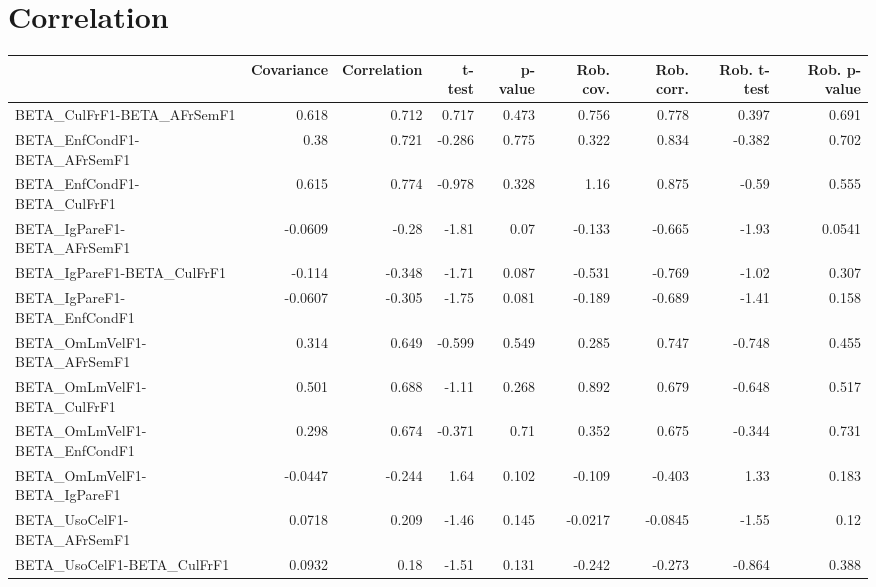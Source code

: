 \section{Correlation}
\begin{tabular}{lrrrrrrrr}
\toprule
{} &  Covariance &  Correlation &  t-test &  p-value &  Rob. cov. &  Rob. corr. &  Rob. t-test &  Rob. p-value \\
\midrule
BETA\_CulFrF1-BETA\_AFrSemF1            &       0.618 &        0.712 &   0.717 &    0.473 &      0.756 &       0.778 &        0.397 &         0.691 \\
BETA\_EnfCondF1-BETA\_AFrSemF1          &        0.38 &        0.721 &  -0.286 &    0.775 &      0.322 &       0.834 &       -0.382 &         0.702 \\
BETA\_EnfCondF1-BETA\_CulFrF1           &       0.615 &        0.774 &  -0.978 &    0.328 &       1.16 &       0.875 &        -0.59 &         0.555 \\
BETA\_IgPareF1-BETA\_AFrSemF1           &     -0.0609 &        -0.28 &   -1.81 &     0.07 &     -0.133 &      -0.665 &        -1.93 &        0.0541 \\
BETA\_IgPareF1-BETA\_CulFrF1            &      -0.114 &       -0.348 &   -1.71 &    0.087 &     -0.531 &      -0.769 &        -1.02 &         0.307 \\
BETA\_IgPareF1-BETA\_EnfCondF1          &     -0.0607 &       -0.305 &   -1.75 &    0.081 &     -0.189 &      -0.689 &        -1.41 &         0.158 \\
BETA\_OmLmVelF1-BETA\_AFrSemF1          &       0.314 &        0.649 &  -0.599 &    0.549 &      0.285 &       0.747 &       -0.748 &         0.455 \\
BETA\_OmLmVelF1-BETA\_CulFrF1           &       0.501 &        0.688 &   -1.11 &    0.268 &      0.892 &       0.679 &       -0.648 &         0.517 \\
BETA\_OmLmVelF1-BETA\_EnfCondF1         &       0.298 &        0.674 &  -0.371 &     0.71 &      0.352 &       0.675 &       -0.344 &         0.731 \\
BETA\_OmLmVelF1-BETA\_IgPareF1          &     -0.0447 &       -0.244 &    1.64 &    0.102 &     -0.109 &      -0.403 &         1.33 &         0.183 \\
BETA\_UsoCelF1-BETA\_AFrSemF1           &      0.0718 &        0.209 &   -1.46 &    0.145 &    -0.0217 &     -0.0845 &        -1.55 &          0.12 \\
BETA\_UsoCelF1-BETA\_CulFrF1            &      0.0932 &         0.18 &   -1.51 &    0.131 &     -0.242 &      -0.273 &       -0.864 &         0.388 \\

\end{tabular}
